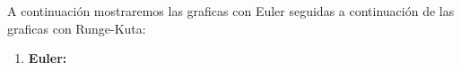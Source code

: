 \documentclass[]{article}
\begin{document}
A continuación mostraremos las graficas con Euler seguidas a continuación de las graficas con Runge-Kuta:
\begin{enumerate}
	\item \textbf{Euler:} 
	\begin{figure}[H]
		\centering
		

\end{figure}
\end{enumerate}
\end{document}
